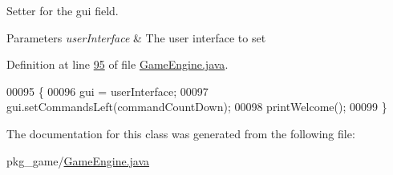 Setter for the gui field. 


\begin{DoxyParams}{Parameters}
{\em user\-Interface} & The user interface to set \\
\hline
\end{DoxyParams}


Definition at line \hyperlink{GameEngine_8java_source_l00095}{95} of file \hyperlink{GameEngine_8java_source}{Game\-Engine.\-java}.


\begin{DoxyCode}
00095                                                     \{
00096         gui = userInterface;
00097         gui.setCommandsLeft(commandCountDown);
00098         printWelcome();
00099     \}
\end{DoxyCode}


The documentation for this class was generated from the following file\-:\begin{DoxyCompactItemize}
\item 
pkg\-\_\-game/\hyperlink{GameEngine_8java}{Game\-Engine.\-java}\end{DoxyCompactItemize}
